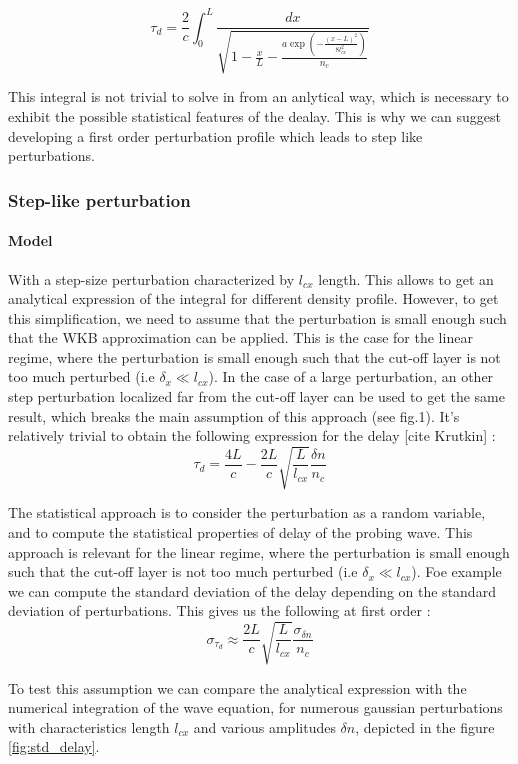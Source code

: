 \documentclass[11pt,a4paper,openany]{report}
\begin{document}
\begin{multicols}{2}
    $$\tau_d = \frac{2}{c} \int_0^L \frac{dx}{\sqrt{1 - \frac{x}{L} - \frac{a \exp(-\frac{(x - L)^2}{8l_{cx}^2})}{n_c}}}$$

    This integral is not trivial to solve in from an anlytical way, which is necessary to exhibit the possible statistical features of the dealay. This is why we can suggest developing a first order perturbation profile which leads to step like perturbations.

    \subsubsection{Step-like perturbation}
    \paragraph{Model}

    With a step-size perturbation characterized by $l_{cx}$ length. This allows to get an analytical expression of the integral for different density profile. However, to get this simplification, we need to assume that the perturbation is small enough such that the WKB approximation can be applied.
    This is the case for the linear regime, where the perturbation is small enough such that the cut-off layer is not too much perturbed (i.e $\delta_x \ll l_{cx}$). In the case of a large perturbation, an other step perturbation localized far from the cut-off layer can be used to get the same result, which breaks the main assumption of this approach (see fig.1).
    It's relatively trivial to obtain the following expression for the delay [cite Krutkin] :
    $$\tau_d = \frac{4L}{c} - \frac{2L}{c}\sqrt{\frac{L}{l_{cx}}}\frac{\delta n}{n_c} $$

    The statistical approach is to consider the perturbation as a random variable, and to compute the statistical properties of delay of the probing wave. This approach is relevant for the linear regime, where the perturbation is small enough such that the cut-off layer is not too much perturbed (i.e $\delta_x \ll l_{cx}$). Foe example we can compute the standard deviation of the delay depending on the standard deviation of perturbations.
    This gives us the following at first order :
    $$\sigma_{\tau_d} \approx \frac{2L}{c}\sqrt{\frac{L}{l_{cx}}}\frac{\sigma_{\delta n}}{n_c}$$

    To test this assumption we can compare the analytical expression with the numerical integration of the wave equation, for numerous gaussian perturbations with characteristics length $l_{cx}$ and various amplitudes $\delta n$, depicted in the figure \ref{fig:std_delay}.
\end{multicols}
\end{document}
